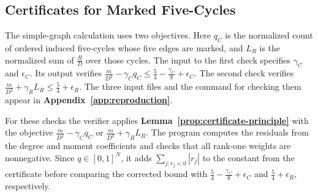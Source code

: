 \subsection{Certificates for Marked Five-Cycles}
\label{app:cycle-estimates}\label{sec:odd}

The simple-graph calculation uses two objectives. Here $q_C$ is
the normalized count of ordered induced five-cycles
whose five edges are marked, and $L_R$ is the normalized sum of
$\frac{R}{D}$ over those cycles. The input to the first check specifies
$\gamma_C$ and $\epsilon_C$. Its output verifies
$\frac{m}{D^2}-\gamma_Cq_C\leq\frac{5}{4}-\frac{\gamma_C}{8}+\epsilon_C$.
The second check verifies
$\frac{m}{D^2}+\gamma_RL_R\leq\frac{5}{4}+\epsilon_R$.
The three input files and the command for checking them appear in
\textbf{Appendix~\ref{app:reproduction}}.

For these checks the verifier applies \textbf{Lemma~\ref{prop:certificate-principle}}
with the objective $\frac{m}{D^2}-\gamma_C q_C$ or
$\frac{m}{D^2}+\gamma_R L_R$. The program computes the residuals from
the degree and moment coefficients and checks that all rank-one
weights are nonnegative. Since $q\in[0,1]^N$, it adds
$\sum_{j:r_j<0}|r_j|$ to the constant from the certificate before
comparing the corrected bound with
$\frac{5}{4}-\frac{\gamma_C}{8}+\epsilon_C$ and
$\frac{5}{4}+\epsilon_R$, respectively.
